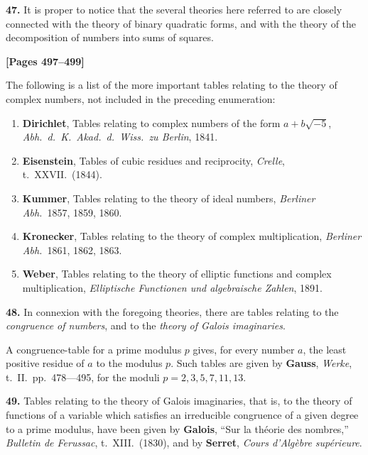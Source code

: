 \documentclass[11pt,a4paper]{article}
\begin{document}
\textbf{47.} It is proper to notice that the several theories here referred to are closely
connected with the theory of binary quadratic forms, and with the theory of the
decomposition of numbers into sums of squares.

\newpage
\textbf{[Pages 497--499]}

The following is a list of the more important tables relating to the theory of complex
numbers, not included in the preceding enumeration:

\begin{enumerate}
\item \textbf{Dirichlet}, Tables relating to complex numbers of the form $a + b\sqrt{-5}$,
\textit{Abh.\ d.\ K.\ Akad.\ d.\ Wiss.\ zu Berlin}, 1841.

\item \textbf{Eisenstein}, Tables of cubic residues and reciprocity, \textit{Crelle}, t.\ XXVII.\ (1844).

\item \textbf{Kummer}, Tables relating to the theory of ideal numbers, \textit{Berliner Abh.}\ 1857, 1859, 1860.

\item \textbf{Kronecker}, Tables relating to the theory of complex multiplication,
\textit{Berliner Abh.}\ 1861, 1862, 1863.

\item \textbf{Weber}, Tables relating to the theory of elliptic functions and complex multiplication,
\textit{Elliptische Functionen und algebraische Zahlen}, 1891.

\end{enumerate}

\textbf{48.} In connexion with the foregoing theories, there are tables relating to the
\textit{congruence of numbers}, and to the \textit{theory of Galois imaginaries}.

A congruence-table for a prime modulus $p$ gives, for every number $a$, the least
positive residue of $a$ to the modulus $p$. Such tables are given by
\quad\textbf{Gauss}, \textit{Werke}, t.\ II.\ pp.\ 478---495, for the moduli $p = 2, 3, 5, 7, 11, 13$.

\textbf{49.} Tables relating to the theory of Galois imaginaries, that is, to the theory of
functions of a variable which satisfies an irreducible congruence of a given degree
to a prime modulus, have been given by
\quad\textbf{Galois}, ``Sur la th\' eorie des nombres,'' \textit{Bulletin de Ferussac}, t.\ XIII.\ (1830),
and by
\quad\textbf{Serret}, \textit{Cours d'Alg\` ebre sup\' erieure}.
\end{document}
